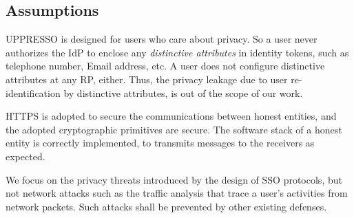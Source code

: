 
\subsection{Assumptions}
UPPRESSO is designed for users who care about privacy.
So a user never authorizes the IdP to enclose any \emph{distinctive attributes} in identity tokens,
 such as telephone number, Email address, etc.
A user does not configure  distinctive attributes at any RP, either.
Thus, the privacy leakage due to user re-identification by distinctive attributes,
    is out of the scope of our work.

HTTPS is adopted to secure the communications between honest entities,
 and the adopted cryptographic primitives are secure.
The software stack of a honest entity is correctly implemented,
     to transmits messages to the receivers as expected.

We focus on the privacy threats introduced by the design of SSO protocols,
    but not network attacks such as the traffic analysis that trace a user's activities from network packets.
Such attacks shall be prevented by other existing defenses.






